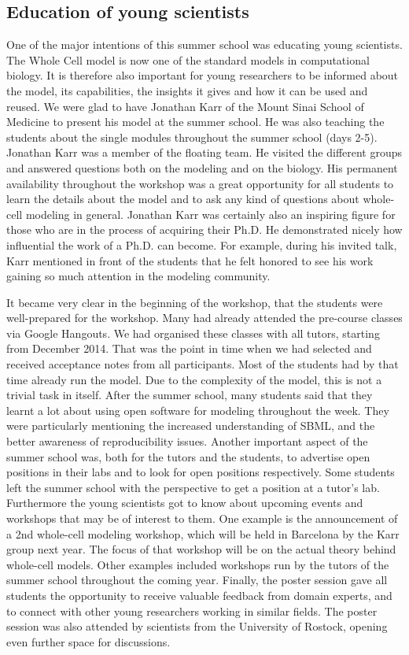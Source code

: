 \documentclass[journal,transmag]{IEEEtran}
\begin{document}
\subsection{Education of young scientists}
One of the major intentions of this summer school was educating young scientists. 
The Whole Cell model is now one of the standard models in computational biology. 
It is therefore also important for young researchers to be informed about the model, its capabilities, the insights it gives and how it can be used and reused. 
We were glad to have Jonathan Karr of the Mount Sinai School of Medicine to present his model at the summer school. 
He was also teaching the students about the single modules throughout the summer school (days 2-5). 
Jonathan Karr was a member of the floating team. He visited the different groups and answered questions both on the modeling and on the biology. 
His permanent availability throughout the workshop was a great opportunity for all students to learn the details about the model and to ask any kind of questions about whole-cell modeling in general. 
Jonathan Karr was certainly also an inspiring figure for those who are in the process of acquiring their Ph.D. 
He demonstrated nicely how influential the work of a Ph.D. can become. 
For example, during his invited talk, Karr mentioned in front of the students that he felt honored to see his work gaining so much attention in the modeling community.

It became very clear in the beginning of the workshop, that the students were well-prepared for the workshop. 
Many had already attended the pre-course classes via Google Hangouts. 
We had organised these classes with all tutors, starting from December 2014. 
That was the point in time when we had selected and received acceptance notes from all participants. 
Most of the students had by that time already run the model. 
Due to the complexity of the model, this is not a trivial task in itself. 
After the summer school, many students said that they learnt a lot about using open software for modeling throughout the week. 
They were particularly mentioning the increased understanding of SBML, and the better awareness of reproducibility issues.
Another important aspect of the summer school was, both for the tutors and the students, to advertise open positions in their labs and to look for open positions respectively. 
Some students left the summer school with the perspective to get a position at a tutor’s lab. 
Furthermore the young scientists got to know about upcoming events and workshops that may be of interest to them. 
One example is the announcement of a 2nd whole-cell modeling workshop, which will be held in Barcelona by the Karr group next year. 
The focus of that workshop will be on the actual theory behind whole-cell models. 
Other examples included workshops run by the tutors of the summer school throughout the coming year.
Finally, the poster session gave all students the opportunity to receive valuable feedback from domain experts, and to connect with other young researchers working in similar fields. 
The poster session was also attended by scientists from the University of Rostock, opening even further space for discussions.
\end{document}
